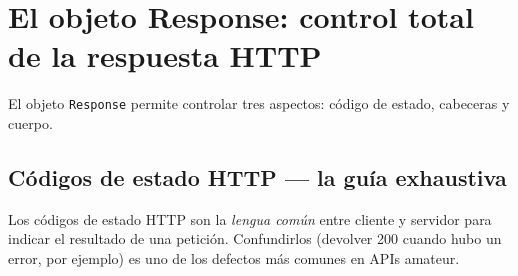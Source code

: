 \documentclass[11pt,a4paper,openany]{book}
\begin{document}
\section{El objeto Response: control total de la respuesta HTTP}

El objeto \texttt{Response} permite controlar tres aspectos:
código de estado, cabeceras y cuerpo.

\subsection{Códigos de estado HTTP --- la guía exhaustiva}

Los códigos de estado HTTP son la \emph{lengua común} entre
cliente y servidor para indicar el resultado de una petición.
Confundirlos (devolver 200 cuando hubo un error, por ejemplo) es uno
de los defectos más comunes en APIs amateur.
\end{document}
